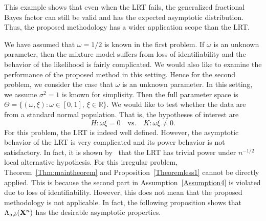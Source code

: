 \documentclass[11pt]{article}
\theoremstyle{plain}
\theoremstyle{definition}
\theoremstyle{remark}
\begin{document}
This example shows that even when the LRT fails, the generalized fractional Bayes factor can still be valid and has the expected asymptotic distribution.
Thus, the proposed methodology has a wider application scope than the LRT.


We have assumed that $\omega=1/2$ is known in the first problem.
If $\omega$ is an unknown parameter, then the mixture model suffers from loss of identifiability and the behavior of the likelihood is fairly complicated.
We would also like to examine the performance of the proposed method in this setting.
Hence for the second problem, we consider the case that $\omega$ is an unknown parameter.
In this setting, we assume $\sigma^2=1$ is known for simplisity.
Then the full parameter space is $\Theta = \{(\omega, \xi): \omega \in [0,1] ,\, \xi \in \mathbb R \}$.
We would like to test whether the data are from a standard normal population.
That is, the hypotheses of interest are
\begin{equation}
    H:\omega \xi=0
    \quad \text{vs.}\quad
    K:\omega \xi \neq 0.
    \label{newHy}
\end{equation}
For this problem, the LRT is indeed well defined.
However, the asymptotic behavior of the LRT is very complicated and its power behavior is not satisfactory.
In fact, it is shown by~\cite{HALL2005158} that the LRT has trivial power under $n^{-1/2}$ local alternative hypothesis. 
For this irregular problem, Theorem~\ref{Thm:maintheorem} and Proposition~\ref{Theoremless1} cannot be directly applied.
This is because the second part in Assumption~\ref{Assumption4} is violated due to loss of identifiability.
However, this does not mean that the proposed methodology is not applicable.
In fact, the following proposition shows that $\Lambda_{a,b}(\mathbf{X}^n)$ has the desirable asymptotic properties.
\end{document}
